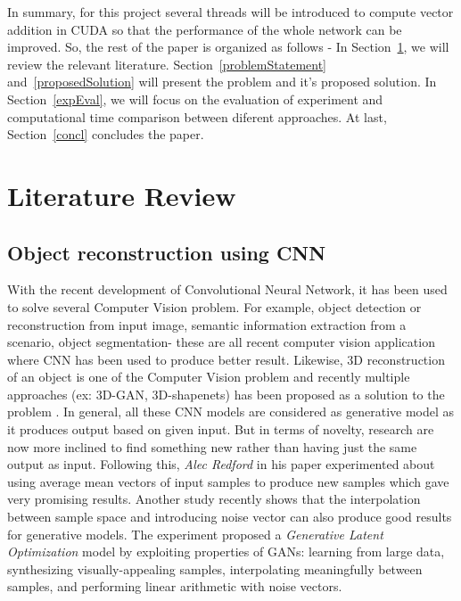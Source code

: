 \documentclass[11pt]{article}       %
\begin{document}
In summary, for this project several threads will be introduced to compute vector addition in CUDA so that the performance of the whole network can be improved. So, the rest of the paper is organized as follows - In Section~\ref{litrev}, we will review the relevant literature. Section~\ref{problemStatement} and~\ref{proposedSolution} will present the problem and it's proposed solution. In Section~\ref{expEval}, we will focus on the evaluation of experiment and computational time comparison between diferent approaches. At last, Section~\ref{concl} concludes the paper.

\section{Literature Review} \label{litrev}
\subsection{Object reconstruction using CNN} \label{subrev1}
With the recent development of Convolutional Neural Network, it has been used to solve several Computer Vision problem. For example, object detection or reconstruction from input image, semantic information extraction from a scenario, object segmentation- these are all recent computer vision application where CNN has been used to produce better result. Likewise, 3D reconstruction of an object is one of the Computer Vision problem and recently multiple approaches (ex: 3D-GAN, 3D-shapenets) has been proposed as a solution to the problem \cite{dr1}. In general, all these CNN models are considered as generative model as it produces output based on given input. But in terms of novelty, research are now more inclined to find something new rather than having just the same output as input. Following this, \textit{Alec Redford} in his paper \cite{radford2015unsupervised} experimented about using average mean vectors of input samples to produce new samples which gave very promising results. Another study recently shows that the interpolation between sample space and introducing noise vector can also produce good results for generative models. The experiment proposed a \textit{Generative Latent Optimization} model by exploiting properties of GANs: learning from large data, synthesizing visually-appealing samples, interpolating meaningfully between
samples, and performing linear arithmetic with noise vectors\cite{bojanowski2017optimizing}.\newline
\end{document}
